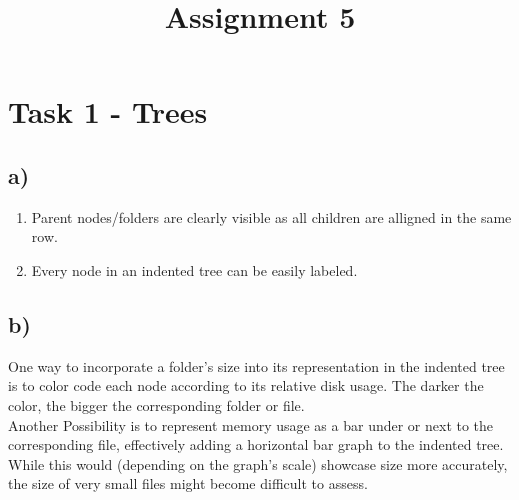 \documentclass[a4paper]{article}
\date{}
\author{}
\title{\textbf{Assignment 5}}
\begin{document}
\maketitle 
\thispagestyle{fancy}

\section*{Task 1 - Trees}
\subsection*{a)}
\begin{enumerate}
	\item Parent nodes/folders are clearly visible as all children are alligned in the same row.
	\item Every node in an indented tree can be easily labeled.
\end{enumerate}
\subsection*{b)}
One way to incorporate a folder's size into its representation in the indented tree is to color code each node according to its relative disk usage. The darker the color, the bigger the corresponding folder or file.\\
Another Possibility is to represent memory usage as a bar under or next to the corresponding file, effectively adding a horizontal bar graph to the indented tree. While this would (depending on the graph's scale) showcase size more accurately, the size of very small files might become difficult to assess.
\end{document}
